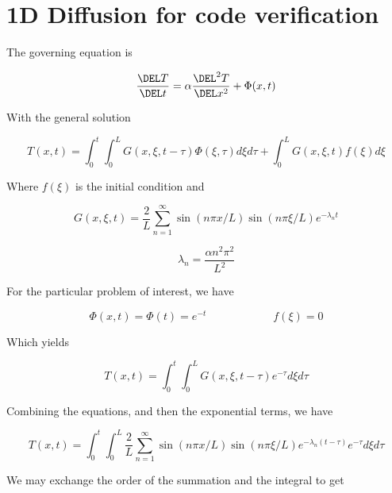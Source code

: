 \documentclass[11pt]{article}
\begin{document}
\doublespacing
\MOONSTITLE
\maketitle

\section{1D Diffusion for code verification}
The governing equation is

\begin{equation}
	\frac{\DEL T}{\DEL t} = \alpha \frac{\DEL^2 T}{\DEL x^2} + \Phi(x,t)
\end{equation}

With the general solution

\begin{equation}
	T(x,t) = \int_0^t \int_0^L G(x,\xi,t-\tau) \Phi(\xi,\tau) d\xi d\tau
	+
	\int_0^L G(x,\xi,t) f(\xi) d\xi
\end{equation}

Where $f(\xi)$ is the initial condition and

\begin{equation}
	G(x,\xi,t) = \frac{2}{L} \sum_{n=1}^{\infty}
	\sin(n\pi x/L)
	\sin(n\pi \xi/L)
	e^{-\lambda_n t}
\end{equation}

\begin{equation}
	\lambda_n = \frac{\alpha n^2\pi^2}{L^2}
\end{equation}

For the particular problem of interest, we have

\begin{equation}
	\Phi(x,t) = \Phi(t) = e^{-t} \qquad \qquad \qquad f(\xi) = 0
\end{equation}

Which yields

\begin{equation}
	T(x,t) = \int_0^t \int_0^L G(x,\xi,t-\tau) e^{-\tau} d\xi d\tau
\end{equation}

Combining the equations, and then the exponential terms, we have

\begin{equation}
	T(x,t) = \int_0^t \int_0^L
	\frac{2}{L} \sum_{n=1}^{\infty}
	\sin(n\pi x/L)
	\sin(n\pi \xi/L)
	e^{-\lambda_n (t-\tau)}
	e^{-\tau}
	d\xi d\tau
\end{equation}

We may exchange the order of the summation and the integral to get
\end{document}
